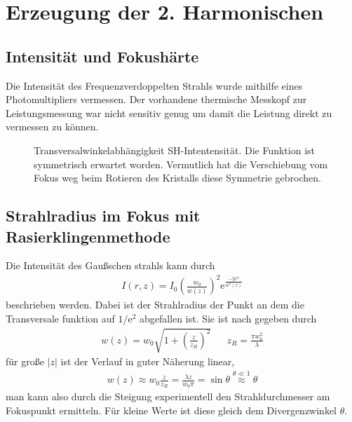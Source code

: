 \documentclass[11pt,twoside=true]{scrartcl}
\newcommand{\e}{\mathrm{e}}
\begin{document}
\section{Erzeugung der 2. Harmonischen}
\subsection{Intensität und Fokushärte}
Die Intensität des Frequenzverdoppelten Strahls wurde mithilfe eines
Photomultipliers vermessen. Der vorhandene thermische Messkopf zur Leistungsmessung
war nicht sensitiv genug um damit die Leistung direkt zu vermessen zu können.


\begin{figure}[H]
  \begin{floatrow}
    {%
      \caption{Transversalwinkelabhängigkeit SH-Intentensität. Die Funktion
      ist symmetrisch erwartet worden. Vermutlich hat die Verschiebung vom Fokus
      weg beim Rotieren des Kristalls diese Symmetrie gebrochen. }
      \label{fig:angle_shg}
    }
  \end{floatrow}
  \end{figure}
  

\subsection{Strahlradius im Fokus mit Rasierklingenmethode}
Die Intensität des Gaußschen strahls kann durch
%
\begin{align*}
  I(r, z) = I_0\left( \frac{w_0}{w(z)} \right)^2 \e^{\frac{-2 r^2}{w^2(z)}}
\end{align*}
%
beschrieben werden. Dabei ist der Strahlradius der Punkt an
dem die Transversale funktion auf $1/\e^2$ abgefallen ist. Sie ist 
nach \cite{gaussbeamwiki} gegeben durch
%
\begin{align*}
  w(z) = w_0 \sqrt{1 + \left( \frac{z}{z_R} \right)^2} && z_R = \frac{\pi w_0^2}{\lambda}
\end{align*}
%
für große $|z|$ ist der Verlauf in guter Näherung linear,
%
\begin{align*}
  w(z) \approx w_0 \frac{z}{z_R} = \frac{\lambda z}{w_0 \pi} = \sin{\theta} 
                      \overset{\theta \ll 1}{\approx} \theta
\end{align*}
%
man kann also durch die Steigung experimentell den Strahldurchmesser
am Fokuspunkt ermitteln. Für kleine Werte ist diese gleich dem Divergenzwinkel
$\theta$. 
\end{document}
